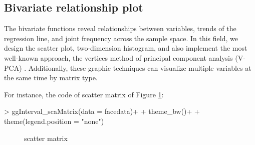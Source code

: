 \documentclass[article]{jss}
\begin{document}

\subsection{Bivariate relationship plot}

The bivariate functions reveal relationships between variables, trends of the regression line, and joint frequency across the sample space. In this field, we design the scatter plot, two-dimension histogram, and also implement the most well-known approach, the vertices method of principal component analysis (V-PCA) \cite{cazes1997extension}. Additionally, these graphic techniques can visualize multiple variables at the same time by matrix type.

For instance, the code of scatter matrix of Figure \ref{fig:scaMatrix}:

\begin{Schunk}
\begin{Sinput}
> ggInterval_scaMatrix(data = facedata)+
+   theme_bw()+
+   theme(legend.position = "none")
\end{Sinput}
\end{Schunk}

\begin{figure}[htbp]
\centering
{}
\caption{\label{fig:scaMatrix} scatter matrix}
\end{figure}
\end{document}
